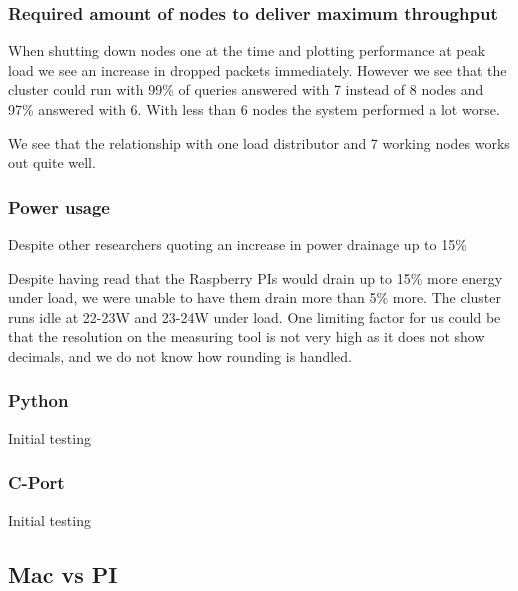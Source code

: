 \subsubsection{Required amount of nodes to deliver maximum throughput}
When shutting down nodes one at the time and plotting performance at peak load we see an increase in dropped packets immediately. However we see that the cluster could run with 99\% of queries answered with 7 instead of 8 nodes and 97\% answered with 6. With less than 6 nodes the system performed a lot worse. 

We see that the relationship with one load distributor and 7 working nodes works out quite well.

\subsubsection{Power usage}
Despite other researchers quoting an increase in power drainage up to 15\%\cite{}

Despite having read that the Raspberry PIs would drain up to 15\% more energy under load, we were unable to have them drain more than 5\% more. The cluster runs idle at 22-23W and 23-24W under load. One limiting factor for us could be that the resolution on the measuring tool is not very high as it does not show decimals, and we do not know how rounding is handled.  




\subsubsection{Python}
Initial testing

\subsubsection{C-Port}
Initial testing
\subsection{Mac vs PI}

